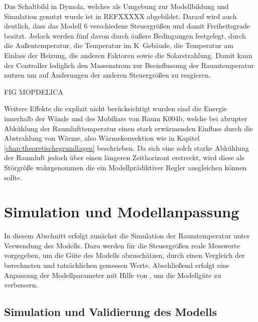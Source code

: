  Das Schaltbild in Dymola, welches als Umgebung zur Modellbildung und Simulation genutzt wurde ist in REFXXXXX abgebildet. Darauf wird auch deutlich, dass das Modell 6 verschiedene Steuergrößen und damit Freiheitsgrade besitzt. Jedoch werden fünf davon durch äußere Bedingungen festgelegt, durch die Außentemperatur, die Temperatur im K~Gebäude, die Temperatur am Einlass der Heizung, die anderen Faktoren sowie die Solarstrahlung. Damit kann der Controller lediglich den Massenstrom zur Beeinflussung der Raumtemperatur nutzen um auf Änderungen der anderen Steuergrößen zu reagieren. 

FIG MOPDELICA

Weitere Effekte die explizit nicht berücksichtigt wurden sind die Energie innerhalb der Wände und des Mobiliars von Raum K004b, welche bei abrupter Abkühlung der Raumlufttemperatur einen stark erwärmenden Einfluss durch die Abstrahlung von Wärme, also Wärmekonvektion wie in Kapitel \ref{chap:theoretischegrundlagen} beschrieben. Da sich eine solch starke Abkühlung der Raumluft jedoch über einen längeren Zeithorizont erstreckt, wird diese als Störgröße wahrgenommen die ein Modellprädiktiver Regler ausgleichen können sollte.


\section{Simulation und Modellanpassung}

In diesem Abschnitt erfolgt zunächst die Simulation der Raumtemperatur unter Verwendung des Modells. Dazu werden für die Steuergrößen reale Messwerte vorgegeben, um die Güte des Modells abzuschätzen, durch einen Vergleich der berechneten und tatsächlichen gemessen Werte. Abschließend erfolgt eine Anpassung der Modellparameter mit Hilfe von \cite{casiopeia}, um die Modellgüte zu verbessern.

\subsection{Simulation und Validierung des Modells}

